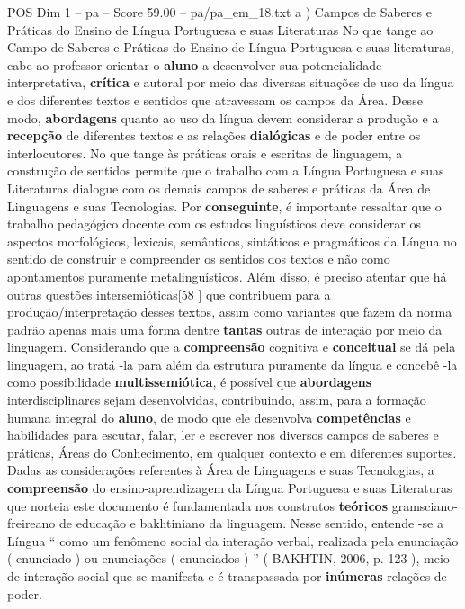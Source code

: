 \begin{textsample}{POS Dim 1 – pa – Score 59.00 – pa/pa\_em\_18.txt}  \label{ex:f1_pos_037}
a ) Campos de Saberes e Práticas do Ensino de Língua Portuguesa e suas Literaturas No que tange ao Campo de Saberes e Práticas do Ensino de Língua Portuguesa e suas literaturas, cabe ao professor orientar o \textbf{aluno} a desenvolver sua potencialidade interpretativa, \textbf{crítica} e autoral por meio das diversas situações de uso da língua e dos diferentes textos e sentidos que atravessam os campos da Área.
Desse modo, \textbf{abordagens} quanto ao uso da língua devem considerar a produção e a \textbf{recepção} de diferentes textos e as relações \textbf{dialógicas} e de poder entre os interlocutores.
No que tange às práticas orais e escritas de linguagem, a construção de sentidos permite que o trabalho com a Língua Portuguesa e suas Literaturas dialogue com os demais campos de saberes e práticas da Área de Linguagens e suas Tecnologias.
Por \textbf{conseguinte}, é importante ressaltar que o trabalho pedagógico docente com os estudos linguísticos deve considerar os aspectos morfológicos, lexicais, semânticos, sintáticos e pragmáticos da Língua no sentido de construir e compreender os sentidos dos textos e não como apontamentos puramente metalinguísticos.
Além disso, é preciso atentar que há outras questões intersemióticas[58 ] que contribuem para a produção/interpretação desses textos, assim como variantes que fazem da norma padrão apenas mais uma forma dentre \textbf{tantas} outras de interação por meio da linguagem.
Considerando que a \textbf{compreensão} cognitiva e \textbf{conceitual} se dá pela linguagem, ao tratá -la para além da estrutura puramente da língua e concebê -la como possibilidade \textbf{multissemiótica}, é possível que \textbf{abordagens} interdisciplinares sejam desenvolvidas, contribuindo, assim, para a formação humana integral do \textbf{aluno}, de modo que ele desenvolva \textbf{competências} e habilidades para escutar, falar, ler e escrever nos diversos campos de saberes e práticas, Áreas do Conhecimento, em qualquer contexto e em diferentes suportes.
Dadas as considerações referentes à Área de Linguagens e suas Tecnologias, a \textbf{compreensão} do ensino-aprendizagem da Língua Portuguesa e suas Literaturas que norteia este documento é fundamentada nos construtos \textbf{teóricos} gramsciano-freireano de educação e bakhtiniano da linguagem.
Nesse sentido, entende -se a Língua “ como um fenômeno social da interação verbal, realizada pela enunciação ( enunciado ) ou enunciações ( enunciados ) ” ( BAKHTIN, 2006, p. 123 ), meio de interação social que se manifesta e é transpassada por \textbf{inúmeras} relações de poder.

\end{textsample}
